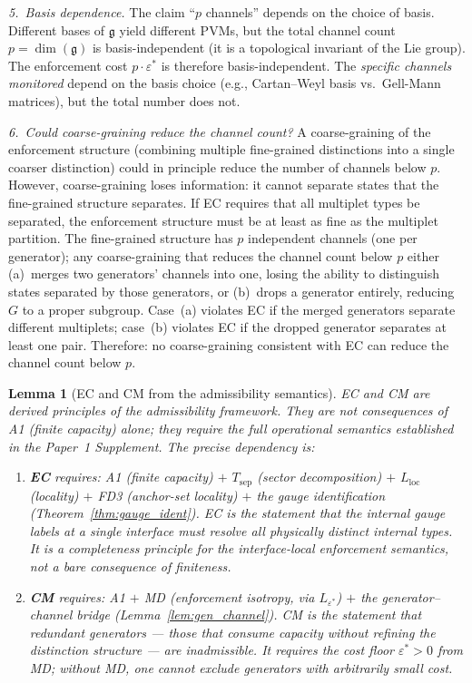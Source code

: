 \documentclass[11pt,a4paper]{article}
\newtheorem{lemma}[theorem]{Lemma}
\theoremstyle{definition}
\begin{document}
\smallskip\noindent\textit{5.\ Basis dependence.}\quad
The claim ``$p$ channels'' depends on the choice of basis.  Different
bases of $\mathfrak{g}$ yield different PVMs, but the total channel
count $p = \dim(\mathfrak{g})$ is basis-independent (it is a
topological invariant of the Lie group).  The enforcement cost
$p \cdot \varepsilon^*$ is therefore basis-independent.  The
\emph{specific channels monitored} depend on the basis choice (e.g.,
Cartan--Weyl basis vs.\ Gell-Mann matrices), but the total number
does not.

\smallskip\noindent\textit{6.\ Could coarse-graining reduce the
channel count?}\quad
A coarse-graining of the enforcement structure (combining multiple
fine-grained distinctions into a single coarser distinction) could
in principle reduce the number of channels below $p$.  However,
coarse-graining loses information: it cannot separate states that
the fine-grained structure separates.  If EC requires that all
multiplet types be separated, the enforcement structure must be at
least as fine as the multiplet partition.  The fine-grained structure
has $p$ independent channels (one per generator); any coarse-graining
that reduces the channel count below $p$ either (a)~merges two
generators' channels into one, losing the ability to distinguish
states separated by those generators, or (b)~drops a generator
entirely, reducing $G$ to a proper subgroup.  Case~(a) violates EC
if the merged generators separate different multiplets; case~(b)
violates EC if the dropped generator separates at least one pair.
Therefore: no coarse-graining consistent with EC can reduce the
channel count below $p$.

\begin{lemma}[EC and CM from the admissibility semantics]\label{lem:EC_CM_from_A1}
EC and CM are derived principles of the admissibility framework.
They are not consequences of A1 (finite capacity) alone; they
require the full operational semantics established in the Paper~1
Supplement.  The precise dependency is:
\begin{enumerate}[label=(\roman*),nosep]
  \item \textbf{EC} requires: A1 (finite capacity) $+$
  $T_{\mathrm{sep}}$ (sector decomposition) $+$
  $L_{\mathrm{loc}}$ (locality) $+$ FD3 (anchor-set locality) $+$
  the gauge identification (Theorem~\ref{thm:gauge_ident}).
  EC is the statement that the internal gauge labels at a single
  interface must resolve all physically distinct internal types.
  It is a \emph{completeness principle for the interface-local
  enforcement semantics}, not a bare consequence of finiteness.
  \item \textbf{CM} requires: A1 $+$ MD (enforcement isotropy, via
  $L_{\varepsilon^*}$) $+$ the generator--channel bridge
  (Lemma~\ref{lem:gen_channel}).
  CM is the statement that redundant generators --- those that
  consume capacity without refining the distinction structure ---
  are inadmissible.  It requires the cost floor $\varepsilon^* > 0$
  from MD; without MD, one cannot exclude generators with
  arbitrarily small cost.
\end{enumerate}
\end{lemma}
\end{document}
